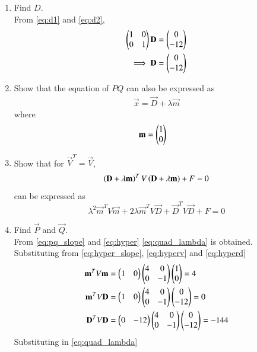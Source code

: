\documentclass[journal,12pt,twocolumn]{IEEEtran}
\renewcommand\thesection{\arabic{section}}
\begin{document}
\begin{enumerate}[label=\thesection.\arabic*
,ref=\thesection.\theenumi]
\begin{align}
\implies \myvec{1 & 0}\vec{x} &= 0
\label{eq:d2}
\end{align}
%
\item Find $D$.
\\
\solution
From \eqref{eq:d1} and \eqref{eq:d2},
\begin{align}
 \begin{pmatrix}1 & 0 \\ 0 &  1\end{pmatrix}\mathbf{D} &= \begin{pmatrix}0 \\ -12 \end{pmatrix}
\\
\implies  \mathbf{D} &= \begin{pmatrix}0 \\ -12 \end{pmatrix}
\label{eq:hyperd}
\end{align}
%
\item Show that the equation of $PQ$ can also be expressed as
\begin{align}
\label{eq:pq_slope}
\vec{x} = \vec{D}+\lambda \vec{m}
\end{align}
where
\begin{align}
\mathbf{m} &=   \begin{pmatrix}1 \\ 0\end{pmatrix}
\label{eq:hyper_slope}
\end{align}
%
\item Show that for $\vec{V}^T = \vec{V}$,
\begin{equation}
\label{eq:quad_md}
\left(\mathbf{D}+\lambda\mathbf{m}\right)^TV\left(\mathbf{D}+\lambda\mathbf{m}\right) + F= 0 
\end{equation}
can be expressed as
\begin{equation}
\label{eq:quad_lambda}
\lambda^2\vec{m}^TV\vec{m}+2\lambda\vec{m}^TV\vec{D}+\vec{D}^TV\vec{D}
+ F = 0
\end{equation}
%
\item Find $\vec{P}$ and $\vec{Q}$.
\\
\solution From \eqref{eq:pq_slope} and \eqref{eq:hyper} \eqref{eq:quad_lambda} is obtained.
%
Substituting from \eqref{eq:hyper_slope}, \eqref{eq:hyperv} and \eqref{eq:hyperd}
\begin{align}
\mathbf{m}^TV\mathbf{m} &= \begin{pmatrix}1& 0\end{pmatrix} \begin{pmatrix}4 & 0 \\ 0 & -1\end{pmatrix}\begin{pmatrix}1 \\ 0\end{pmatrix} = 4
\\
\mathbf{m}^TV\mathbf{D} & = \begin{pmatrix}1& 0\end{pmatrix}\begin{pmatrix}4 & 0 \\ 0 & -1\end{pmatrix}\begin{pmatrix}0 \\ -12 \end{pmatrix} = 0
\\
\mathbf{D}^TV\mathbf{D} &= \begin{pmatrix}0 & -12 \end{pmatrix}\begin{pmatrix}4 & 0 \\ 0 & -1\end{pmatrix}\begin{pmatrix}0 \\ -12 \end{pmatrix} = -144
\end{align}
%
Substituting in \eqref{eq:quad_lambda}

\end{enumerate}
\end{document}
